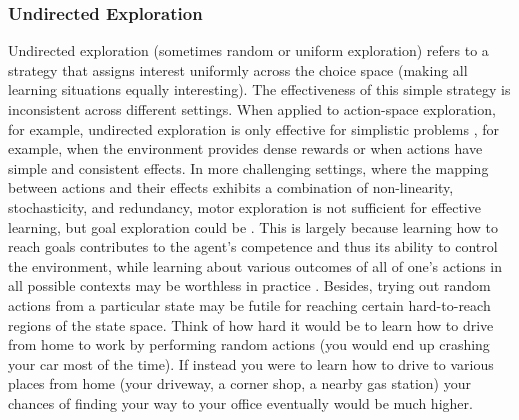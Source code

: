 \subsubsection{Undirected Exploration}\label{subsub:3-undirected}
Undirected exploration (sometimes random or uniform exploration) refers to a strategy that assigns interest uniformly across the choice space (making all learning situations equally interesting). The effectiveness of this simple strategy is inconsistent across different settings. When applied to action-space exploration, for example, undirected exploration is only effective for simplistic problems \parencite{baranes_active_2013,benureau_behavioral_2016}, for example, when the environment provides dense rewards or when actions have simple and consistent effects. In more challenging settings, where the mapping between actions and their effects exhibits a combination of non-linearity, stochasticity, and redundancy, motor exploration is not sufficient for effective learning, but goal exploration could be \parencite{moulin-frier_exploration_2013}. This is largely because learning how to reach goals contributes to the agent’s competence and thus its ability to control the environment, while learning about various outcomes of all of one’s actions in all possible contexts may be worthless in practice \parencite{mirolli_functions_2013}. Besides, trying out random actions from a particular state may be futile for reaching certain hard-to-reach regions of the state space. Think of how hard it would be to learn how to drive from home to work by performing random actions (you would end up crashing your car most of the time). If instead you were to learn how to drive to various places from home (your driveway, a corner shop, a nearby gas station) your chances of finding your way to your office eventually would be much higher. 

